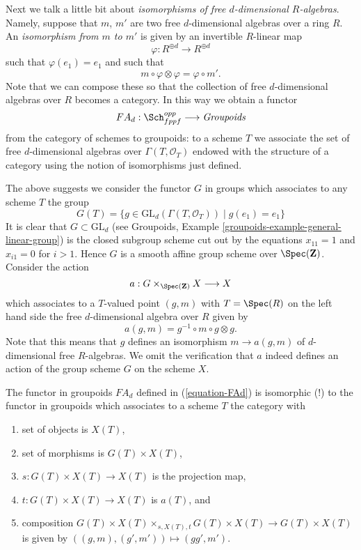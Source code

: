 \medskip\noindent
Next we talk a little bit about {\it isomorphisms of free $d$-dimensional
$R$-algebras}. Namely, suppose that $m$, $m'$ are two free $d$-dimensional
algebras over a ring $R$. An {\it isomorphism from $m$ to $m'$} is given by
an invertible $R$-linear map
$$
\varphi : R^{\oplus d} \longrightarrow R^{\oplus d}
$$
such that $\varphi(e_1) = e_1$ and such that
$$
m \circ \varphi \otimes \varphi = \varphi \circ m'.
$$
Note that we can compose these so that the collection of
free $d$-dimensional algebras over $R$ becomes a category.
In this way we obtain a functor
\begin{equation}
\label{equation-FAd}
FA_d : \Sch_{fppf}^{opp} \longrightarrow \textit{Groupoids}
\end{equation}
from the category of schemes to groupoids: to a scheme $T$ we associate the
set of free $d$-dimensional algebras over $\Gamma(T, \mathcal{O}_T)$
endowed with the structure
of a category using the notion of isomorphisms just defined.

\medskip\noindent
The above suggests we consider the functor $G$ in groups
which associates to any scheme $T$ the group
$$
G(T) = \{g \in \text{GL}_d(\Gamma(T, \mathcal{O}_T)) \mid g(e_1) = e_1\}
$$
It is clear that $G \subset \text{GL}_d$ (see
Groupoids, Example \ref{groupoids-example-general-linear-group})
is the closed subgroup scheme cut out by the equations
$x_{11} = 1$ and $x_{i1} = 0$ for $i > 1$. Hence $G$ is a smooth
affine group scheme over $\Spec(\mathbf{Z})$. Consider the
action
$$
a : G \times_{\Spec(\mathbf{Z})} X \longrightarrow X
$$
which associates to a $T$-valued point $(g, m)$ with $T = \Spec(R)$
on the left hand side the free $d$-dimensional algebra over $R$
given by
$$
a(g, m) = g^{-1} \circ m \circ g \otimes g.
$$
Note that this means that $g$ defines an isomorphism $m \to a(g, m)$
of $d$-dimensional free $R$-algebras. We omit the verification that
$a$ indeed defines an action of the group scheme $G$ on the scheme $X$.

\begin{lemma}
\label{lemma-represent-FAd}
The functor in groupoids $FA_d$ defined in (\ref{equation-FAd})
is isomorphic (!) to the functor in groupoids which associates
to a scheme $T$ the category with
\begin{enumerate}
\item set of objects is $X(T)$,
\item set of morphisms is $G(T) \times X(T)$,
\item $s : G(T) \times X(T) \to X(T)$ is the projection map,
\item $t : G(T) \times X(T) \to X(T)$ is $a(T)$, and
\item composition $G(T) \times X(T) \times_{s, X(T), t} G(T) \times X(T)
\to G(T) \times X(T)$ is given by $((g, m), (g', m')) \mapsto (gg', m')$.
\end{enumerate}
\end{lemma}

